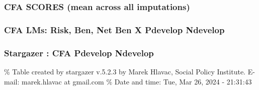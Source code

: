 \documentclass[
]{article}
\begin{document}
\hypertarget{cfa-scores-mean-across-all-imputations}{%
\subsubsection{CFA SCORES (mean across all
imputations)}\label{cfa-scores-mean-across-all-imputations}}

\hypertarget{cfa-lms-risk-ben-net-ben-x-pdevelop-ndevelop}{%
\subsubsection{CFA LMs: Risk, Ben, Net Ben X Pdevelop
Ndevelop}\label{cfa-lms-risk-ben-net-ben-x-pdevelop-ndevelop}}

\hypertarget{stargazer-cfa-pdevelop-ndevelop}{%
\subsubsection{Stargazer : CFA Pdevelop
Ndevelop}\label{stargazer-cfa-pdevelop-ndevelop}}

\begingroup\setlength{\tabcolsep}{1pt}

\renewcommand{\arraystretch}{0.7}

\% Table created by stargazer v.5.2.3 by Marek Hlavac, Social Policy
Institute. E-mail: marek.hlavac at gmail.com \% Date and time: Tue, Mar
26, 2024 - 21:31:43
\end{document}
